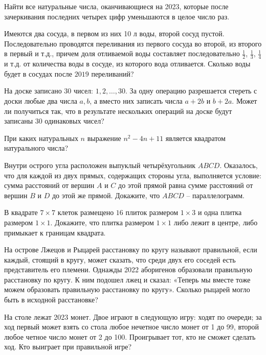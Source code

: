 \documentclass{article}
\begin{document}
\begin{enumerate_boxed}
        \item Найти все натуральные числа, оканчивающиеся на 2023, которые после зачеркивания последних четырех цифр уменьшаются в целое число раз.

        \item Имеются два сосуда, в первом из них 10 л воды, второй сосуд пустой.
        Последовательно проводятся переливания из первого сосуда во второй, из второго в первый и т.д., причем доля отливаемой воды составляет последовательно $\frac{1}{2}$, $\frac{1}{3}$, $\frac{1}{4}$ и т.д. от количества воды в сосуде, из которого вода отливается.
        Сколько воды будет в сосудах после $2019$ переливаний?

        \item На доске записано 30 чисел: $1, 2, \dotsc, 30$.
        За одну операцию разрешается стереть с доски любые два числа $a, b$, а вместо них записать числа $a + 2b$ и $b + 2a$.
        Может ли получиться так, что в результате нескольких операций на доске будут записаны 30 одинаковых чисел?

        \item При каких натуральных $n$ выражение $n^2 - 4n + 11$ является квадратом натурального числа?

        \item Внутри острого угла расположен выпуклый четырёхугольник $ABCD$.
        Оказалось, что для каждой из двух прямых, содержащих стороны угла, выполняется условие: сумма расстояний от вершин $A$ и $C$ до этой прямой равна сумме расстояний от вершин $B$ и $D$ до этой же прямой.
        Докажите, что $ABCD$ – параллелограмм.

        \item В квадрате $7 \times 7$ клеток размещено $16$ плиток размером $1 \times 3$ и одна плитка размером $1 \times 1$.
        Докажите, что плитка размером $1 \times 1$ либо лежит в центре, либо примыкает к границам квадрата.

        \item На острове Лжецов и Рыцарей расстановку по кругу называют правильной, если каждый, стоящий в кругу, может сказать, что среди двух его соседей есть представитель его племени.
        Однажды 2022 аборигенов образовали правильную расстановку по кругу.
        К ним подошел лжец и сказал: «Теперь мы вместе тоже можем образовать правильную расстановку по кругу».
        Сколько рыцарей могло быть в исходной расстановке?

        \item На столе лежат 2023 монет.
        Двое играют в следующую игру: ходят по очереди; за ход первый может взять со стола любое нечетное число монет от 1 до 99, второй любое четное число монет от 2 до 100.
        Проигрывает тот, кто не сможет сделать ход.
        Кто выиграет при правильной игре?


\end{enumerate_boxed}
\end{document}
